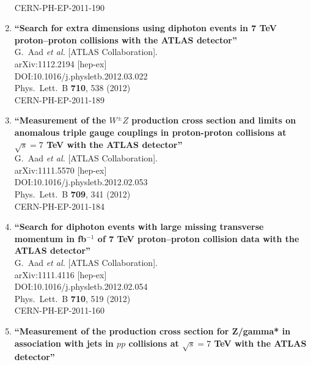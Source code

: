 \documentclass{article}
\begin{document}
\begin{enumerate}
  \\{}CERN-PH-EP-2011-190
\item%
{\bf ``Search for extra dimensions using diphoton events in 7 TeV proton–proton collisions with the ATLAS detector''}
  \\{}G.~Aad {\it et al.} [ATLAS Collaboration].
  \\{}arXiv:1112.2194 [hep-ex]
  \\{}DOI:10.1016/j.physletb.2012.03.022
  \\{}Phys.\ Lett.\ B {\bf 710}, 538 (2012)
  \\{}CERN-PH-EP-2011-189
\item%
{\bf ``Measurement of the $W^\pm Z$ production cross section and limits on anomalous triple gauge couplings in proton-proton collisions at $\sqrt{s}=7$ TeV with the ATLAS detector''}
  \\{}G.~Aad {\it et al.} [ATLAS Collaboration].
  \\{}arXiv:1111.5570 [hep-ex]
  \\{}DOI:10.1016/j.physletb.2012.02.053
  \\{}Phys.\ Lett.\ B {\bf 709}, 341 (2012)
  \\{}CERN-PH-EP-2011-184
\item%
{\bf ``Search for diphoton events with large missing transverse momentum in fb$^{-1}$ of 7 TeV proton–proton collision data with the ATLAS detector''}
  \\{}G.~Aad {\it et al.} [ATLAS Collaboration].
  \\{}arXiv:1111.4116 [hep-ex]
  \\{}DOI:10.1016/j.physletb.2012.02.054
  \\{}Phys.\ Lett.\ B {\bf 710}, 519 (2012)
  \\{}CERN-PH-EP-2011-160
\item%
{\bf ``Measurement of the production cross section for Z/gamma* in association with jets in $pp$ collisions at $\sqrt{s}=7$ TeV with the ATLAS detector''}

\end{enumerate}
\end{document}
